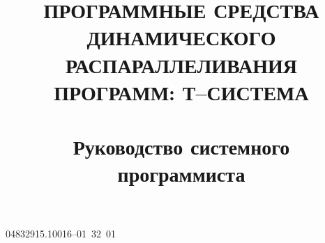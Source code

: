 \documentclass[a4paper,12pt]{article}
\begin{document}
\sloppy
\title{ПРОГРАММНЫЕ СРЕДСТВА ДИНАМИЧЕСКОГО
РАСПАРАЛЛЕЛИВАНИЯ ПРОГРАММ: Т--СИСТЕМА \\
~\\
Руководство системного программиста}

\begin{uspd}{04832915.10016--01~32~01}



\end{uspd}
\end{document}
